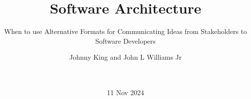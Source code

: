 \documentclass{acm_proc_article-sp}
\begin{document}
\title{Software Architecture}

\subtitle{When to use Alternative Formats for Communicating Ideas from Stakeholders to Software Developers}


%
%
%
%
%

%
\author{
%
%
\alignauthor
Johnny King and John L Williams Jr\\
       \\
       \\
    }


\date{11 Nov 2024}
\end{document}
